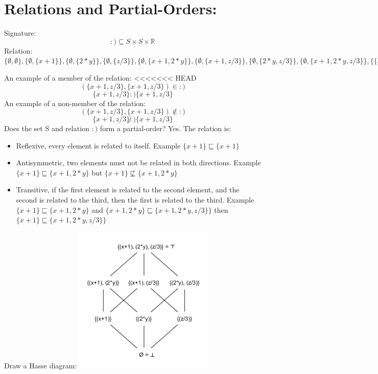 \documentclass{article}
\begin{document}


\section*{Relations and Partial-Orders:}
Signature:
$$ :) \subseteq S \times S \times \mathbb{R}$$
Relation:
$
\{\emptyset,\emptyset\}, 
\{\emptyset, \{x+1\}\},
\{\emptyset, \{2*y\}\}, 
\{\emptyset, \{z/3\}\}, 
\{\emptyset, \{x+1, 2*y\}\}, 
\{\emptyset, \{x+1, z/3\}\}, 
\{\emptyset, \{2*y, z/3\}\}, 
\{\emptyset, \{x+1, 2*y, z/3\}\},
\{\{x+1\}, \{x+1\}\}, 
\{\{x+1\}, \{x+1, 2*y\}\}, 
\{\{x+1\}, \{x+1, z/3\}\}, 
\{\{x+1\}, \{x+1, 2*y, z/3\}\},
\{\{2*y\}, \{2*y\}\},
\{\{2*y\}, \{x+1, 2*y\}\},
\{\{2*y\}, \{2*y, z/3\}\}, 
\{\{2*y\}, \{x+1, 2*y, z/3\}\},
\{\{z/3\}, \{z/3\}\},
\{\{z/3\}, \{x+1, z/3\}\}, 
\{\{z/3\}, \{2*y, z/3\}\},   
\{\{z/3\}, \{x+1, 2*y, z/3\}\},
\{\{x+1, 2*y\}, \{x+1, 2*y\}\},  
\{\{x+1, 2*y\}, \{x+1, 2*y, z/3\}\},
\{\{2*y, z/3\}, \{2*y, z/3\}\},  
\{\{2*y, z/3\}, \{x+1, 2*y, z/3\}\},
\{\{x+1, z/3\}, \{x+1, z/3\}\},  
\{\{x+1, z/3\}, \{x+1, 2*y, z/3\}\},
\{\{x+1, 2*y, z/3\}, \{x+1, 2*y, z/3\}\},
$

An example of a member of the relation:
<<<<<<< HEAD
$$(\{x+1, z/3\}, \{x+1, z/3\}) \in :)$$
$$\{x+1, z/3\}:)\{x+1, z/3\}$$
An example of a non-member of the relation:
$$(\{x+1, z/3\}, \{x+1, z/3\}) \notin :)$$
$$\{x+1, z/3\}\not:)\{x+1, z/3\}$$
Does the set S and relation $:)$ form a partial-order? Yes. The relation is:\\
\begin{itemize}
	\item Reflexive, every element is related to itself. Example $\{x+1\}\sqsubseteq\{x+1\}$
	\item Antisymmetric, two elements must not be related in both directions. Example $\{x+1\}\sqsubseteq\{x+1, 2*y\}$ but $\{x+1\}\not\sqsubseteq\{x+1, 2*y\}$
	\item Transitive, if the first element is related to the second element, and the second is related to the third, then the first is related to the third. Example $\{x+1\}\sqsubseteq\{x+1, 2*y\}$ and $\{x+1, 2*y\}\sqsubseteq\{x+1, 2*y, z/3\}\}$ then $\{x+1\}\sqsubseteq\{x+1, 2*y, z/3\}\}$
\end{itemize}
Draw a Hasse diagram:
\includegraphics[width=0.5\textwidth]{Hasse}
\end{document}
